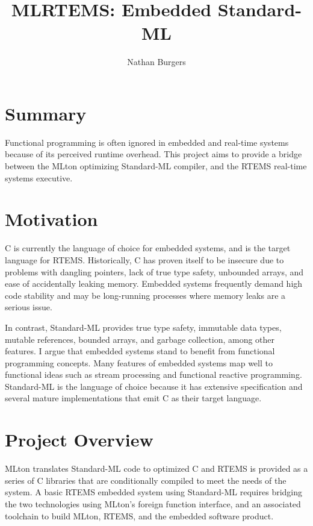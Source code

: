 \documentclass[12pt]{article}
\title{MLRTEMS: Embedded Standard-ML}
\author{Nathan Burgers}
\begin{document}
\maketitle

\section{Summary}
Functional programming is often ignored in embedded and real-time systems because of its perceived runtime overhead. This project aims to provide a bridge between the MLton optimizing Standard-ML compiler, and the RTEMS real-time systems executive.

\section{Motivation}
C is currently the language of choice for embedded systems, and is the target language for RTEMS. Historically, C has proven itself to be insecure due to problems with dangling pointers, lack of true type safety, unbounded arrays, and ease of accidentally leaking memory. Embedded systems frequently demand high code stability and may be long-running processes where memory leaks are a serious issue.

In contrast, Standard-ML provides true type safety, immutable data types, mutable references, bounded arrays, and garbage collection, among other features. I argue that embedded systems stand to benefit from functional programming concepts. Many features of embedded systems map well to functional ideas such as stream processing and functional reactive programming. Standard-ML is the language of choice because it has extensive specification and several mature implementations that emit C as their target language.

\section{Project Overview}

MLton translates Standard-ML code to optimized C and RTEMS is provided as a series of C libraries that are conditionally compiled to meet the needs of the system. A basic RTEMS embedded system using Standard-ML requires bridging the two technologies using MLton's foreign function interface, and an associated toolchain to build MLton, RTEMS, and the embedded software product.
\end{document}
